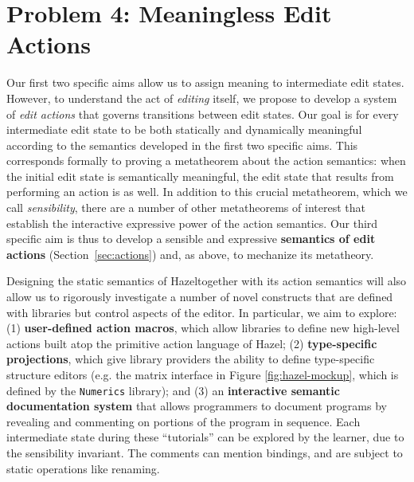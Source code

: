\documentclass[letterpaper,USenglish]{lipics-v2016}
\let\li\lstinline
\newcommand{\Hazel}[0]{\textsf{Hazel}}
\newcommand{\HazelEnv}[0]{\Hazel}
\begin{document}
\section{Problem 4: Meaningless Edit Actions} Our first two specific aims
allow us to assign meaning to intermediate edit states. However, to
understand the act of \emph{editing} itself, we propose to develop a system of
\emph{edit actions} that governs transitions between edit
states. Our goal is for every intermediate edit state to be both statically and
dynamically meaningful according to the semantics developed in the first two
specific aims. This corresponds formally to proving a
metatheorem about the action semantics: when the initial edit state is
semantically meaningful, the edit state that results from performing an action
is as well. In addition to this crucial metatheorem, which
we call \emph{sensibility}, there are a number of other metatheorems of interest
that establish the interactive expressive power of the action semantics. Our third specific
aim is thus to develop a sensible and expressive \textbf{semantics of edit actions} (Section~\ref{sec:actions})
and, as above, to mechanize its metatheory.

Designing the static semantics of \HazelEnv together with its action semantics 
will also allow us to rigorously investigate a number of novel constructs that 
are defined with libraries but control aspects of the editor. In particular, we aim to explore:
(1) \textbf{user-defined action macros}, which allow libraries to define new high-level
actions built atop the primitive action language of \HazelEnv; (2) \textbf{type-specific
projections}, which give library providers the ability to define type-specific structure editors (e.g. the matrix interface in Figure \ref{fig:hazel-mockup}, which is defined  
by the \li{Numerics} library); and (3) an \textbf{interactive semantic documentation system} that
allows programmers to document programs by revealing and commenting on portions of the 
program in sequence. Each intermediate state during these ``tutorials'' can be explored 
by the learner, due to the sensibility invariant. The comments can mention bindings, and are 
subject to static operations like renaming.
\end{document}
